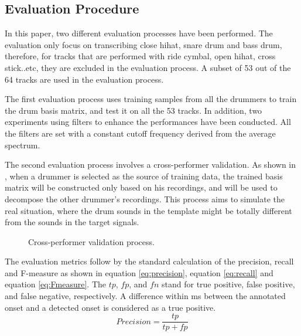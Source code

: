 \documentclass{article}
\begin{document}
\subsection{Evaluation Procedure}\label{subsec:evaluation procedure}

In this paper, two different evaluation processes have been performed. The evaluation only focus on transcribing close hihat, snare drum and bass drum, therefore, for tracks that are performed with ride cymbal, open hihat, cross stick..etc, they are excluded in the evaluation process. A subset of 53 out of the 64 tracks are used in the evaluation process. 

The first evaluation process uses training samples from all the drummers to train the drum basis matrix, and test it on all the 53 tracks. In addition, two experiments using filters to enhance the performances have been conducted. All the filters are set with a constant cutoff frequency derived from the average spectrum. 

The second evaluation process involves a cross-performer validation. As shown in , when a drummer is selected as the source of training data, the trained basis matrix will be constructed only based on his recordings, and will be used to decompose the other drummer’s recordings. This process aims to simulate the real situation, where the drum sounds in the template might be totally different from the sounds in the target signals.
\begin{figure}
 \centerline{}
 \caption{Cross-performer validation process.}
 \label{fig:cross}
\end{figure}

The evaluation metrics follow by the standard calculation of the precision, recall and F-measure as shown in equation \eqref{eq:precision}, equation \eqref{eq:recall} and equation \eqref{eq:Fmeasure}. The $tp$, $fp$, and $fn$ stand for true positive, false positive, and false negative, respectively. A difference within \unit[50]{ms} between the annotated onset and a detected onset is considered as a true positive.  
\begin{equation}
Precision = \frac{tp}{tp + fp}
\label{eq:precision}
\end{equation}
\end{document}
